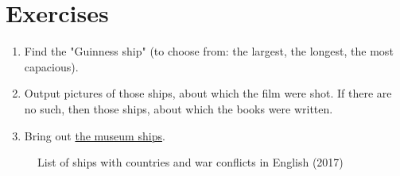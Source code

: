 \section{Exercises}

\begin{enumerate}
  \label{ship_tasks}
  \item Find the "Guinness ship" (to choose from: the largest, the longest, the most capacious).
  \item Output pictures of those ships, about which the film were shot. If there are no such, then those ships, about which the books were written.
  \item Bring out \href{https://en.wikipedia.org/wiki/List_of_museum_ships}{the museum ships}.
\end{enumerate}



\begin{figure*}[ht]
  {
  \setlength{\fboxsep}{0pt}%
  \setlength{\fboxrule}{1pt}%
  }
    \caption{List of ships with countries and war conflicts in English (2017)}%
    \label{fig:ships_by_country_and_conflict}%
\end{figure*}
